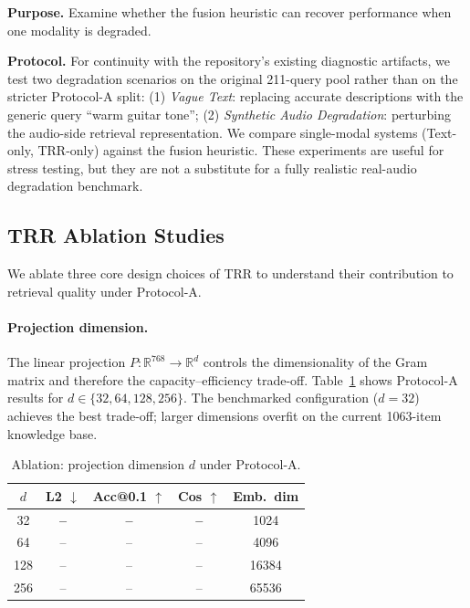 \textbf{Purpose.} Examine whether the fusion heuristic can recover performance when one modality is degraded.

\textbf{Protocol.} For continuity with the repository's existing diagnostic artifacts, we test two degradation scenarios on the original 211-query pool rather than on the stricter Protocol-A split: (1) \textit{Vague Text}: replacing accurate descriptions with the generic query ``warm guitar tone''; (2) \textit{Synthetic Audio Degradation}: perturbing the audio-side retrieval representation. We compare single-modal systems (Text-only, TRR-only) against the fusion heuristic. These experiments are useful for stress testing, but they are not a substitute for a fully realistic real-audio degradation benchmark.

\subsection{TRR Ablation Studies}
\label{ssec:ablation}

We ablate three core design choices of TRR to understand their contribution to retrieval quality under Protocol-A.

\paragraph{Projection dimension.}
The linear projection $P:\mathbb{R}^{768}\to\mathbb{R}^{d}$ controls the dimensionality of the Gram matrix and therefore the capacity--efficiency trade-off. Table~\ref{tab:ablation_proj_dim} shows Protocol-A results for $d\in\{32,64,128,256\}$. The benchmarked configuration ($d{=}32$) achieves the best trade-off; larger dimensions overfit on the current 1063-item knowledge base.

\begin{table}[t]
\centering
\caption{Ablation: projection dimension $d$ under Protocol-A.}
\label{tab:ablation_proj_dim}
\small
\begin{tabular}{ccccc}
\toprule
$d$ & \textbf{L2} $\downarrow$ & \textbf{Acc@0.1} $\uparrow$ & \textbf{Cos} $\uparrow$ & \textbf{Emb.\ dim} \\
\midrule
32 & \textbf{--} & \textbf{--} & \textbf{--} & 1024 \\
64 & -- & -- & -- & 4096 \\
128 & -- & -- & -- & 16384 \\
256 & -- & -- & -- & 65536 \\
\bottomrule
\end{tabular}
\end{table}

